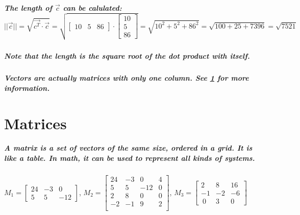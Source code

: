 \documentclass[11pt]{report}
\begin{document}
    \paragraph{
    The length of \(\vec{c}\) can be calulated: \[\lvert\lvert\vec{c}\lvert\lvert = \sqrt{\vec{c^T} \cdot \vec{c}} = \sqrt{\begin{bmatrix}
        10&
        5&
        86
    \end{bmatrix} \cdot \begin{bmatrix}
        10\\
        5\\
        86
    \end{bmatrix}} = \sqrt{10^2 + 5^2 + 86^2 } = \sqrt{100 + 25 + 7396} = \sqrt{7521}\]
    }

    \paragraph{
    Note that the length is the square root of the dot product with itself. 
    }

    \paragraph{
    Vectors are actually matrices with only one column. See \ref{Matrices} for more information. 
    }
    
	\chapter{Matrices}\label{Matrices}

    \paragraph{
    A matrix is a set of vectors of the same size, ordered in a grid. It is like a table. In math, it can be used to represent all kinds of systems. 
    }

    \begin{center}
        \(M_1 = \begin{bmatrix}
        24 & -3 & 0\\
        5 & 5 & -12
    \end{bmatrix}\),
    \(M_2 = \begin{bmatrix}
        24 & -3 & 0 & 4\\
        5 & 5 & -12 & 0\\
        2 & 8 & 0 & 0 \\
        -2 & -1 & 9 & 2\\
    \end{bmatrix}\),
    \(M_3 = \begin{bmatrix}
        2 & 8 & 16\\
        -1 & -2 & -6\\\
        0 & 3 & 0
    \end{bmatrix}\)
    \end{center}
\end{document}

